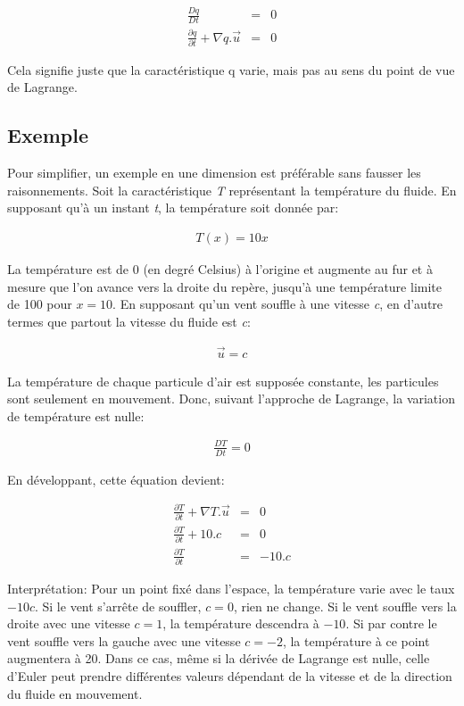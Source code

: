 \documentclass[11pt]{report}
\begin{document}
\begin{eqnarray}
\frac{Dq}{Dt} & = & 0 \\
\frac{\partial q}{\partial t} + \nabla q. \overrightarrow{u} & = & 0
\end{eqnarray}

Cela signifie juste que la caractéristique q varie, mais pas au sens du point de vue de Lagrange.

\subsection{Exemple}

Pour simplifier, un exemple en une dimension est préférable sans fausser les raisonnements. Soit la caractéristique \textit{T} représentant la température du fluide. En supposant qu'à un instant \textit{t}, la température soit donnée par: 

\begin{eqnarray*}
T(x) = 10 x
\end{eqnarray*}

La température est de 0 (en degré Celsius) à l'origine et augmente au fur et à mesure que l'on avance vers la droite du repère, jusqu'à une température limite de 100 pour $x = 10 $. En supposant qu'un vent souffle à une vitesse \textit{c},  en d'autre termes que partout la vitesse du fluide est \textit{c}:

\begin{eqnarray*}
\overrightarrow{u} = c
\end{eqnarray*}

La température de chaque particule d'air est supposée constante, les particules sont seulement en mouvement. Donc, suivant l'approche de Lagrange, la variation de température est nulle:

\begin{eqnarray*}
\frac{DT}{Dt} = 0
\end{eqnarray*} 

En développant, cette équation devient:

\begin{eqnarray*}
\frac{\partial T}{\partial t} + \nabla T.\overrightarrow{u} & = & 0 \\
\frac{\partial T}{\partial t} + 10.c & = & 0 \\
\frac{\partial T}{\partial t}  & = & - 10.c
\end{eqnarray*} 

Interprétation: Pour un point fixé dans l'espace, la température varie avec le taux $ -10c $. Si le vent s'arrête de souffler, $ c = 0 $, rien ne change. Si le vent souffle vers la droite avec une vitesse $ c = 1 $, la température descendra à $ -10 $. Si par contre le vent souffle vers la gauche avec une vitesse $ c = -2 $, la température à ce point augmentera à 20. Dans ce cas, même si la dérivée de Lagrange est nulle, celle d'Euler peut prendre différentes valeurs dépendant de la vitesse et de la direction du fluide en mouvement. 
\end{document}
